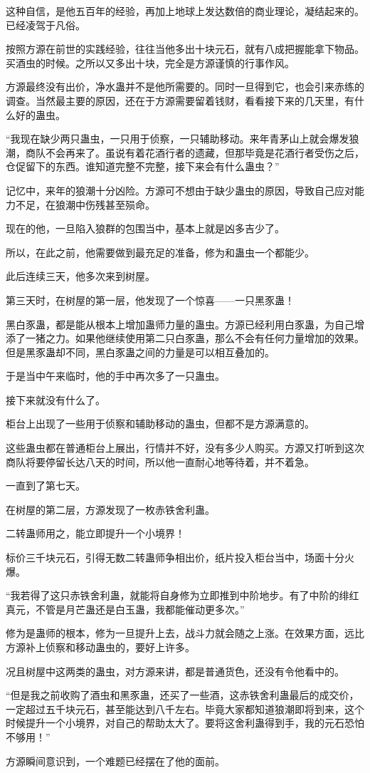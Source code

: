 \begin{this_body}
这种自信，是他五百年的经验，再加上地球上发达数倍的商业理论，凝结起来的。已经凌驾于凡俗。

按照方源在前世的实践经验，往往当他多出十块元石，就有八成把握能拿下物品。买酒虫的时候。之所以又多出十块，完全是方源谨慎的行事作风。

方源最终没有出价，净水蛊并不是他所需要的。同时一旦得到它，也会引来赤练的调查。当然最主要的原因，还在于方源需要留着钱财，看看接下来的几天里，有什么好的蛊虫。

“我现在缺少两只蛊虫，一只用于侦察，一只辅助移动。来年青茅山上就会爆发狼潮，商队不会再来了。虽说有着花酒行者的遗藏，但那毕竟是花酒行者受伤之后，仓促留下的东西。谁知道完整不完整，接下来会有什么蛊虫？”

记忆中，来年的狼潮十分凶险。方源可不想由于缺少蛊虫的原因，导致自己应对能力不足，在狼潮中伤残甚至殒命。

现在的他，一旦陷入狼群的包围当中，基本上就是凶多吉少了。

所以，在此之前，他需要做到最充足的准备，修为和蛊虫一个都能少。

此后连续三天，他多次来到树屋。

第三天时，在树屋的第一层，他发现了一个惊喜——一只黑豕蛊！

黑白豕蛊，都是能从根本上增加蛊师力量的蛊虫。方源已经利用白豕蛊，为自己增添了一猪之力。如果他继续使用第二只白豕蛊，那么不会有任何力量增加的效果。但是黑豕蛊却不同，黑白豕蛊之间的力量是可以相互叠加的。

于是当中午来临时，他的手中再次多了一只蛊虫。

接下来就没有什么了。

柜台上出现了一些用于侦察和辅助移动的蛊虫，但都不是方源满意的。

这些蛊虫都在普通柜台上展出，行情并不好，没有多少人购买。方源又打听到这次商队将要停留长达八天的时间，所以他一直耐心地等待着，并不着急。

一直到了第七天。

在树屋的第二层，方源发现了一枚赤铁舍利蛊。

二转蛊师用之，能立即提升一个小境界！

标价三千块元石，引得无数二转蛊师争相出价，纸片投入柜台当中，场面十分火爆。

“我若得了这只赤铁舍利蛊，就能将自身修为立即推到中阶地步。有了中阶的绯红真元，不管是月芒蛊还是白玉蛊，我都能催动更多次。”

修为是蛊师的根本，修为一旦提升上去，战斗力就会随之上涨。在效果方面，远比方源补上侦察和移动蛊虫的，要好上许多。

况且树屋中这两类的蛊虫，对方源来讲，都是普通货色，还没有令他看中的。

“但是我之前收购了酒虫和黑豕蛊，还买了一些酒，这赤铁舍利蛊最后的成交价，一定超过五千块元石，甚至能达到八千左右。毕竟大家都知道狼潮即将到来，这个时候提升一个小境界，对自己的帮助太大了。要将这舍利蛊得到手，我的元石恐怕不够用！”

方源瞬间意识到，一个难题已经摆在了他的面前。

\end{this_body}

